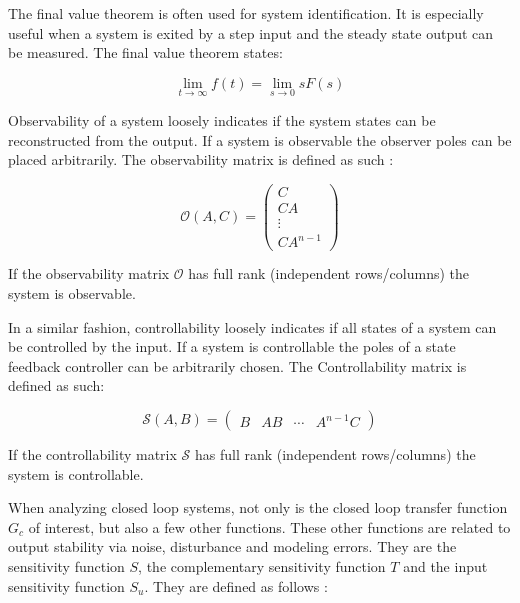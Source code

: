 \documentclass[a4paper, titlepage]{article}
\begin{document}
The final value theorem is often used for system identification.
It is especially useful when a system is exited by a step input and the steady state output can be measured.
The final value theorem states\citep[p.~29]{glad00}:

\begin{equation}
\lim_{t \to \infty} f(t) = \lim_{s \to 0} sF(s)
\label{equ:finalTheorem}
\end{equation}

Observability of a system loosely indicates if the system states can be reconstructed from the output. If a system is observable the observer poles can be placed arbitrarily.
The observability matrix is defined as such \citep[p.~45]{glad00}:

\begin{equation}
\mathcal{O}(A,C) = 
\begin{pmatrix}
C \\ CA \\ \vdots \\ CA^{n-1}
\end{pmatrix}
\label{equ:observ}
\end{equation}

If the observability matrix $\mathcal{O}$ has full rank (independent rows/columns) the system is observable.

In a similar fashion, controllability loosely indicates if all states of a system can be controlled by the input. If a system is controllable the poles of a state feedback controller can be arbitrarily chosen.
The Controllability matrix is defined as such\citep[p.~31]{glad00}:

\begin{equation}
\mathcal{S}(A,B) = 
\begin{pmatrix}
B & AB & \cdots & A^{n-1}C
\end{pmatrix}
\label{equ:contr}
\end{equation}

If the controllability matrix $\mathcal{S}$ has full rank (independent rows/columns) the system is controllable.

When analyzing closed loop systems, not only is the closed loop transfer function $G_c$ of interest, but also a few other functions.
These other functions are related to output stability via noise, disturbance and modeling errors.
They are the sensitivity function $S$, the complementary sensitivity function $T$ and the input sensitivity function $S_u$.
They are defined as follows \citep[p.~149]{glad00}:
\end{document}
